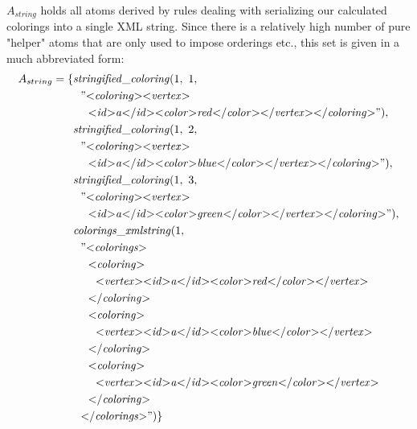\begin{example}
$A_{string}$ holds all atoms derived by rules dealing with serializing our calculated colorings into a single XML string. Since there is a relatively high number of pure "helper" atoms that are only used to impose orderings etc., this set is given in a much abbreviated form:
\begin{align*}
    A_{string} = \{&\mathit{stringified\_coloring}(1,~1,\\
                   &~~"\mathit{{<}coloring{>}{<}vertex{>}}\\
                   &~~~~\mathit{{<}id{>}a{<}/id{>}{<}color{>}red{<}/color{>}{<}/vertex{>}{<}/coloring{>}}"),\\
                   &\mathit{stringified\_coloring}(1,~2,\\
                   &~~"\mathit{{<}coloring{>}{<}vertex{>}}\\
                   &~~~~\mathit{{<}id{>}a{<}/id{>}{<}color{>}blue{<}/color{>}{<}/vertex{>}{<}/coloring{>}}"),\\
                   &\mathit{stringified\_coloring}(1,~3,\\
                   &~~"\mathit{{<}coloring{>}{<}vertex{>}}\\
                   &~~~~\mathit{{<}id{>}a{<}/id{>}{<}color{>}green{<}/color{>}{<}/vertex{>}{<}/coloring{>}}"),\\
                   &\mathit{colorings\_xmlstring}(1,\\
                   &~~"\mathit{{<}colorings{>}}\\
                   &~~~~\mathit{{<}coloring{>}}\\
                   &~~~~~~\mathit{{<}vertex{>}{<}id{>}a{<}/id{>}{<}color{>}red{<}/color{>}{<}/vertex{>}}\\
                   &~~~~\mathit{{<}/coloring{>}}\\
                   &~~~~\mathit{{<}coloring{>}}\\
                   &~~~~~~\mathit{{<}vertex{>}{<}id{>}a{<}/id{>}{<}color{>}blue{<}/color{>}{<}/vertex{>}}\\
                   &~~~~\mathit{{<}/coloring{>}}\\
                   &~~~~\mathit{{<}coloring{>}}\\
                   &~~~~~~\mathit{{<}vertex{>}{<}id{>}a{<}/id{>}{<}color{>}green{<}/color{>}{<}/vertex{>}}\\
                   &~~~~\mathit{{<}/coloring{>}}\\
                   &~~\mathit{{<}/colorings{>}}")\}
\end{align*}


\end{example}
